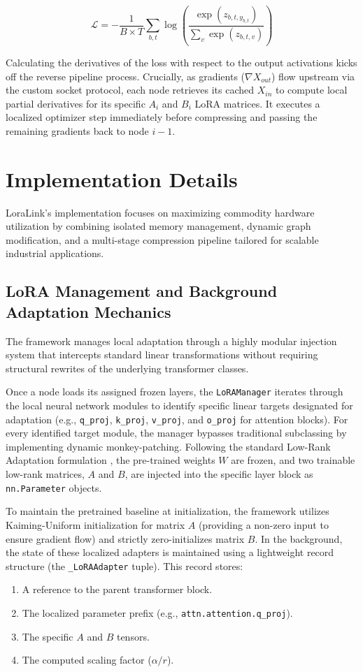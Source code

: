 \documentclass{ieeeaccess}
\begin{document}
\begin{equation}
\mathcal{L} = - \frac{1}{B \times T} \sum_{b,t} \log \left( \frac{\exp(z_{b,t,y_{b,t}})}{\sum_v \exp(z_{b,t,v})} \right)
\end{equation}

Calculating the derivatives of the loss with respect to the output activations kicks off the reverse pipeline process. Crucially, as gradients ($\nabla X_{out}$) flow upstream via the custom socket protocol, each node retrieves its cached $X_{in}$ to compute local partial derivatives for its specific $A_i$ and $B_i$ LoRA matrices. It executes a localized optimizer step immediately before compressing and passing the remaining gradients back to node $i-1$.

\section{Implementation Details}

LoraLink's implementation focuses on maximizing commodity hardware utilization by combining isolated memory management, dynamic graph modification, and a multi-stage compression pipeline tailored for scalable industrial applications.

\subsection{LoRA Management and Background Adaptation Mechanics}
The framework manages local adaptation through a highly modular injection system that intercepts standard linear transformations without requiring structural rewrites of the underlying transformer classes.

Once a node loads its assigned frozen layers, the \texttt{LoRAManager} iterates through the local neural network modules to identify specific linear targets designated for adaptation (e.g., \texttt{q\_proj}, \texttt{k\_proj}, \texttt{v\_proj}, and \texttt{o\_proj} for attention blocks). For every identified target module, the manager bypasses traditional subclassing by implementing dynamic monkey-patching. Following the standard Low-Rank Adaptation formulation \cite{hu2021lora}, the pre-trained weights $W$ are frozen, and two trainable low-rank matrices, $A$ and $B$, are injected into the specific layer block as \texttt{nn.Parameter} objects.

To maintain the pretrained baseline at initialization, the framework utilizes Kaiming-Uniform initialization for matrix $A$ (providing a non-zero input to ensure gradient flow) and strictly zero-initializes matrix $B$. In the background, the state of these localized adapters is maintained using a lightweight record structure (the \texttt{\_LoRAAdapter} tuple). This record stores:
\begin{enumerate}
    \item A reference to the parent transformer block.
    \item The localized parameter prefix (e.g., \texttt{attn.attention.q\_proj}).
    \item The specific $A$ and $B$ tensors.
    \item The computed scaling factor ($\alpha / r$).
\end{enumerate}
\end{document}

